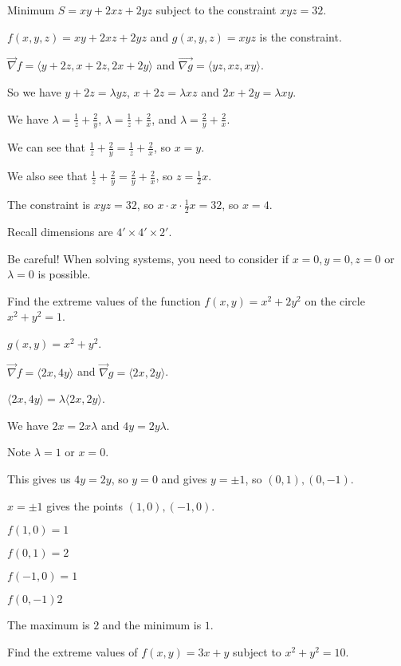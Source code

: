 \documentclass[../calc3.tex]{subfiles}
\begin{document}
\begin{example}
    Minimum $S=xy+2xz+2yz$ subject to the constraint $xyz=32$.

    $f(x,y,z)=xy+2xz+2yz$ and $g(x,y,z)=xyz$ is the constraint.

    $\vec{\nabla}f=\langle y+2z,x+2z,2x+2y\rangle$ and $\vec{\nabla g}=\langle yz,xz,xy\rangle$.

    So we have $y+2z=\lambda yz$, $x+2z=\lambda xz$ and $2x+2y=\lambda xy$.

    We have $\lambda = \frac{1}{z}+\frac{2}{y}$, $\lambda = \frac{1}{z}+\frac{2}{x}$, and $\lambda = \frac{2}{y}+\frac{2}{x}$.

    We can see that $\frac{1}{z}+\frac{2}{y}=\frac{1}{z}+\frac{2}{x}$, so $x=y$.

    We also see that $\frac{1}{z}+\frac{2}{y}=\frac{2}{y}+\frac{2}{x}$, so $z=\frac{1}{2}x$.

    The constraint is $xyz=32$, so $x\cdot x\cdot \frac{1}{2}x=32$, so $x=4$.

    Recall dimensions are $4'\times 4'\times 2'$.
\end{example}

Be careful! When solving systems, you need to consider if $x=0, y=0, z=0$ or $\lambda=0$ is possible.

\begin{example}
    Find the extreme values of the function $f(x,y)=x^2+2y^2$ on the circle $x^2+y^2=1$.

    $g(x,y)=x^2+y^2$.

    $\vec{\nabla}f=\langle 2x,4y\rangle$ and $\vec{\nabla}g=\langle 2x,2y\rangle$.

    $\langle 2x,4y\rangle = \lambda\langle 2x,2y\rangle$.

    We have $2x=2x\lambda$ and $4y=2y\lambda$.

    Note $\lambda = 1$ or $x=0$.

    This gives us $4y=2y$, so $y=0$ and gives $y=\pm 1$, so $(0,1), (0,-1)$.

    $x=\pm 1$ gives the points $(1,0), (-1,0)$.

    $f(1,0)= 1$

    $f(0,1)= 2$

    $f(-1,0)=1$

    $f(0,-1)2$

    The maximum is $2$ and the minimum is $1$.
\end{example}

\ex Find the extreme values of $f(x,y)=3x+y$ subject to $x^2+y^2=10$.
\end{document}
